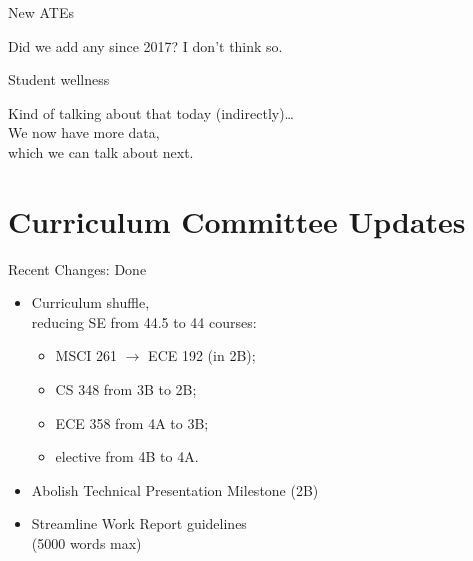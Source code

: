 \documentclass{beamer}
\newenvironment{changemargin}[1]{%
  \begin{list}{}{%
    \setlength{\topsep}{0pt}%
    \setlength{\leftmargin}{#1}%
    \setlength{\rightmargin}{1em}
    \setlength{\listparindent}{\parindent}%
    \setlength{\itemindent}{\parindent}%
    \setlength{\parsep}{\parskip}%
  }%
  \item[]}{\end{list}}
\begin{document}
\begin{frame}{New ATEs}
  \begin{changemargin}{1em}
    Did we add any since 2017? I don't think so.
  \end{changemargin}
\end{frame}

\begin{frame}{Student wellness}
  \Large
  \begin{changemargin}{1em}
    Kind of talking about that today (indirectly)\ldots\\[1em]
    
    We now have more data, \\ \qquad which we can talk about next.
  \end{changemargin}
\end{frame}

\part{Curriculum Committee Updates}
\frame{\partpage}

\begin{frame}{Recent Changes: Done}
  \Large
  \begin{changemargin}{1em}
    \begin{itemize}
    \item Curriculum shuffle, \\[0.2em]
      \qquad reducing SE from 44.5 to 44 courses:
      \begin{itemize}
      \item MSCI 261 $\rightarrow$ ECE 192 (in 2B);
      \item CS 348 from 3B to 2B;
      \item ECE 358 from 4A to 3B;
      \item elective from 4B to 4A.
      \end{itemize}
    \item Abolish Technical Presentation Milestone (2B)
    \item Streamline Work Report guidelines \\ \qquad (5000 words max)
    \end{itemize}
  \end{changemargin}
\end{frame}
\end{document}
